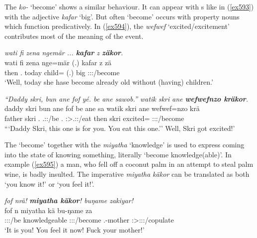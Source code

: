The  \emph{ko-} `become' shows a similar behaviour. It can appear with s like in (\ref{ex593}) with the adjective \emph{kafar} `big'. But often `become' occurs with property nouns which function predicatively. In (\ref{ex594}), the  \emph{wefwef} `excited/excitement' contributes most of the meaning of the event.

\begin{exe}
	\ex \emph{wati fi zena ngemär ... \textbf{kafar} z \textbf{zäkor}.}\\
	\gll wati fi zena nge=mär (.) kafar z zä\\
	then \Third.\Abs{} today child=\Priv{} (.) big \Iam{} \Sg:\Sbj:\Rpst:\Pfv/become\\
	\trans `Well, today she hase become already old without (having) children.'\\
	\label{ex593}
\end{exe}
\begin{exe}
	\ex \emph{``Daddy skri, bun ane fof yé. be ane sawob.'' watik skri ane \textbf{wefwefnzo kräkor}.}\\
	\gll daddy skri bun ane fof  be ane sa watik skri ane wefwef=nzo krä\\
	father skri \Ssg.\Dat{} \Dem{} \Emph{} \Tsg.\Masc:\Nonpast:\Ipfv/be \Ssg.\Erg{} \Dem{} \Ssg:\Sbj>\Tsg.\Masc:\Imp:\Pfv/eat then skri \Dem{} excited=\Only{} \Stsg:\Sbj:\Irr:\Pfv/become\\
	\trans ```Daddy Skri, this one is for you. You eat this one.'' Well, Skri got excited!'\\
	\label{ex594}
\end{exe}

The  `become' together with the  \emph{miyatha} `knowledge' is used to express coming into the state of knowing something, literally `become knowledge(able)'. In example (\ref{ex595}) a man, who fell off a coconut palm in an attempt to steal palm wine, is badly insulted. The imperative \emph{miyatha käkor} can be translated as both `you know it!' or `you feel it!'.

\begin{exe}
	\ex \emph{fof nrä! \textbf{miyatha käkor}! buŋame zakiyar!}\\
	\gll fof n miyatha kä bu-ŋame za\\
	\Emph{} \Ssg:\Sbj:\Nonpast:\Ipfv/be knowledgeable \Ssg:\Sbj:\Imp:\Pfv/become \Ssg.\Poss-mother \Ssg:\Sbj>\Tsg:\F:\Imp:\Pfv/copulate\\
	\trans `It is you! You feel it now! Fuck your mother!'
	\label{ex595}
\end{exe}

